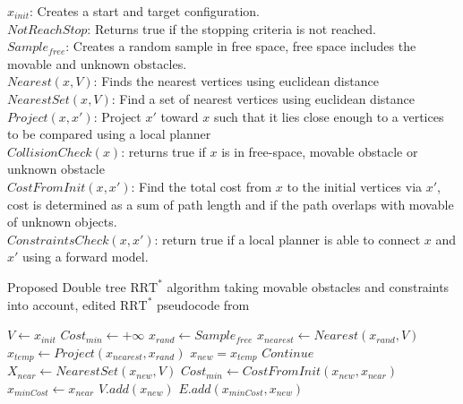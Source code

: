 \noindent $x_{init}$: Creates a start and target configuration. \\ $NotReachStop$: Returns true if the stopping criteria is not reached. \\ $Sample_{free}$: Creates a random sample in free space, free space includes the movable and unknown obstacles. \\ $Nearest(x, V)$: Finds the nearest vertices using euclidean distance \\ $NearestSet(x, V)$: Find a set of nearest vertices using euclidean distance \\ $Project(x, x')$: Project $x'$ toward $x$ such that it lies close enough to a vertices to be compared using a local planner \\ $CollisionCheck(x)$: returns true if $x$ is in free-space, movable obstacle or unknown obstacle \\  $CostFromInit(x, x')$: Find the total cost from $x$ to the initial vertices via $x'$, cost is determined as a sum of path length and if the path overlaps with movable of unknown objects. \\ $ConstraintsCheck(x, x')$: return true if a local planner is able to connect $x$ and $x'$ using a forward model. \\

\begin{algorithm}[H]
\caption{Proposed Double tree $\text{RRT}^*$ algorithm taking movable obstacles and constraints into account, edited $\text{RRT}^*$ pseudocode from \cite{chen_fast_2018}}
\label{pseudocode: rrt_star}
\begin{algorithmic}[1]
\State $V \leftarrow x_{init}$
    \State $Cost_{min} \leftarrow +\infty$
    \State $x_{rand} \leftarrow Sample_{free}$
    \State $x_{nearest} \leftarrow Nearest(x_{rand}, V)$
    \State $x_{temp} \leftarrow Project(x_{nearest}, x_{rand})$
        \State $x_{new} = x_{temp}$
        \Else
        \State $Continue$
    \EndIf
    \State $X_{near} \leftarrow NearestSet(x_{new}, V) $
            \State $Cost_{min} \leftarrow CostFromInit(x_{new}, x_{near})$
            \State $x_{minCost} \leftarrow x_{near}$
            \EndIf
        \EndIf
    \EndFor
        \State $V.add(x_{new})$
        \State $E.add(x_{minCost}, x_{new})$
    \EndIf
\EndWhile
\end{algorithmic}
\end{algorithm}

